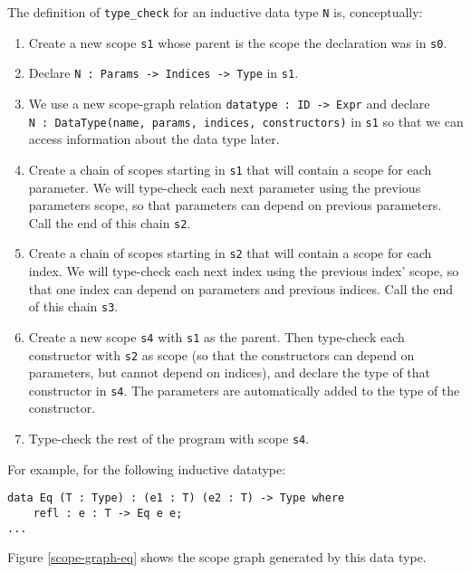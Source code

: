The definition of \verb|type_check| for an inductive data type \verb|N| is, conceptually:
\begin{enumerate}
	\item Create a new scope \verb|s1| whose parent is the scope the declaration was in \verb|s0|.
	\item \label{name-decl}Declare \verb|N : Params -> Indices -> Type| in \verb|s1|.
	\item \label{datatype-decl}We use a new scope-graph relation \verb|datatype : ID -> Expr| and declare \\ \verb|N : DataType(name, params, indices, constructors)| in \verb|s1| so that we can access information about the data type later.
	
	\item Create a chain of scopes starting in \verb|s1| that will contain a scope for each parameter. We will type-check each next parameter using the previous parameters scope, so that parameters can depend on previous parameters. Call the end of this chain \verb|s2|.
	
	\item Create a chain of scopes starting in \verb|s2| that will contain a scope for each index. We will type-check each next index using the previous index' scope, so that one index can depend on parameters and previous indices. Call the end of this chain \verb|s3|.
	
	\item Create a new scope \verb|s4| with \verb|s1| as the parent. Then type-check each constructor with \verb|s2| as scope (so that the constructors can depend on parameters, but cannot depend on indices), and declare the type of that constructor in \verb|s4|. The parameters are automatically added to the type of the constructor.
	
	\item Type-check the rest of the program with scope \verb|s4|.
\end{enumerate}
For example, for the following inductive datatype:
\begin{lstlisting}
data Eq (T : Type) : (e1 : T) (e2 : T) -> Type where
	refl : e : T -> Eq e e;
...
\end{lstlisting}
Figure \ref{scope-graph-eq} shows the scope graph generated by this data type.
